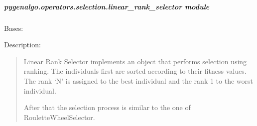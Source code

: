 \documentclass[letterpaper,10pt,english]{sphinxmanual}
\begin{document}
\subparagraph{pygenalgo.operators.selection.linear\_rank\_selector module}
\label{\detokenize{pygenalgo.operators.selection:module-pygenalgo.operators.selection.linear_rank_selector}}\label{\detokenize{pygenalgo.operators.selection:pygenalgo-operators-selection-linear-rank-selector-module}}

\begin{fulllineitems}
\label{\detokenize{pygenalgo.operators.selection:pygenalgo.operators.selection.linear_rank_selector.LinearRankSelector}}
\pysigstartsignatures
\pysiglinewithargsret
{}
{}
{}
\pysigstopsignatures
\sphinxAtStartPar
Bases: {\hyperref[\detokenize{pygenalgo.operators.selection:pygenalgo.operators.selection.select_operator.SelectionOperator}]{}}

\sphinxAtStartPar
Description:
\begin{quote}

\sphinxAtStartPar
Linear Rank Selector implements an object that performs selection using ranking.
The individuals first are sorted according to their fitness values. The rank ‘N’
is assigned to the best individual and the rank 1 to the worst individual.

\sphinxAtStartPar
After that the selection process is similar to the one of RouletteWheelSelector.
\end{quote}


\end{fulllineitems}
\end{document}
